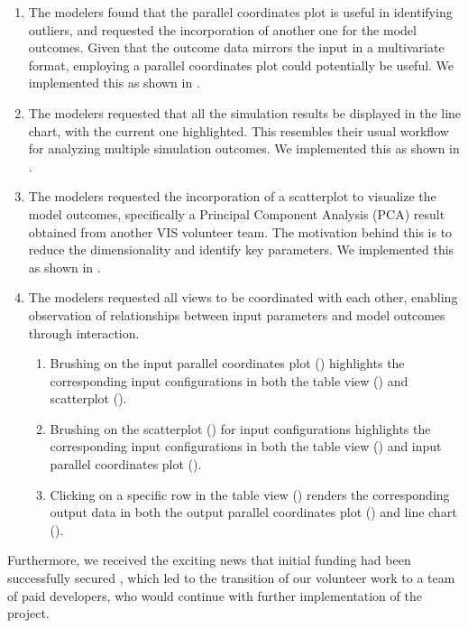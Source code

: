 \begin{enumerate}[itemsep=0pt,topsep=0pt]
    \item The modelers found that the parallel coordinates plot is useful in identifying outliers, and requested the incorporation of another one for the model outcomes.
    Given that the outcome data mirrors the input in a multivariate format, employing a parallel coordinates plot could potentially be useful.
    We implemented this as shown in .
    \item The modelers requested that all the simulation results be displayed in the line chart, with the current one highlighted.
    This resembles their usual workflow for analyzing multiple simulation outcomes.
    We implemented this as shown in .
    \item The modelers requested the incorporation of a scatterplot to visualize the model outcomes, specifically a Principal Component Analysis (PCA) result obtained from another VIS volunteer team.
    The motivation behind this is to reduce the dimensionality and identify key parameters.
    We implemented this as shown in .
    \item The modelers requested all views to be coordinated with each other, enabling observation of relationships between input parameters and model outcomes through interaction. 
    \begin{enumerate}[itemsep=0pt,topsep=0pt]
        \item Brushing on the input parallel coordinates plot () highlights the corresponding input configurations in both the table view () and scatterplot ().
        \item Brushing on the scatterplot () for input configurations highlights the corresponding input configurations in both the table view () and input parallel coordinates plot ().
        \item Clicking on a specific row in the table view () renders the corresponding output data in both the output parallel coordinates plot () and line chart ().
    \end{enumerate}
\end{enumerate}
\endgroup

Furthermore, we received the exciting news that initial funding had been successfully secured \cite{engineering&physicalsciencesresearchcouncil2021RAMP}, which led to the transition of our volunteer work to a team of paid developers, who would continue with further implementation of the project.

